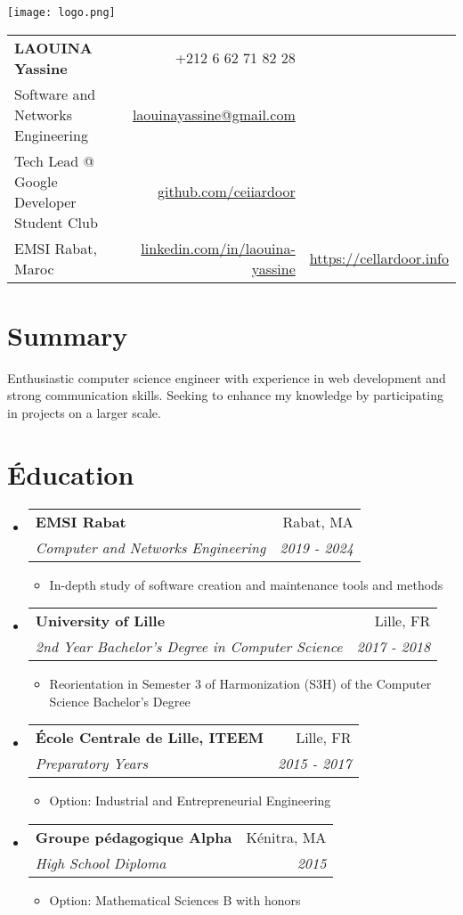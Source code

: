 \documentclass[a4paper,11pt]{article}
\makeatletter
\newcommand{\resitem}[1]{\item #1 \vspace{-1pt}}
\newcommand{\ressubheading}[4]{
\begin{tabular*}{6.5in}{l@{\cftdotfill{\cftsecdotsep}\extracolsep{\fill}}r}
		\textbf{#1} & #2 \\
		\textit{#3} & \textit{#4} \\
\end{tabular*}\vspace{-6pt}}
\newcommand{\name}{LAOUINA Yassine}
\newcommand{\course}{Software and Networks Engineering}
\newcommand{\phone}{62 71 82 28}
\newcommand{\emaila}{laouinayassine@gmail.com}
\newcommand{\github}{github.com/ceiiardoor}
\newcommand{\website}{https://cellardoor.info}
\newcommand{\linkedin}{linkedin.com/in/laouina-yassine}
\makeatother
\begin{document}
\selectfont

\parbox{2.35cm}{

\texttt{[image: logo.png]}

}
\parbox{\dimexpr\linewidth-2.8cm\relax}{
\begin{tabularx}{\linewidth}{L r}
  \textbf{\LARGE \name} & +212 6 \phone\\
  
  \course &  \href{mailto:\emaila}{\emaila}\\
   {Tech Lead @ Google Developer Student Club} &  \href{https://github.com/ceiiardoor}{\github} \\ 
  {EMSI Rabat, Maroc} & \href{https://www.linkedin.com/in/laouina-yassine/}{\linkedin} & \href{https://cellardoor.info/}{\website} 
\end{tabularx}
}
\vspace{-3mm}

\section{\textbf{Summary}}
Enthusiastic computer science engineer with experience in web development and strong communication skills. Seeking to enhance my knowledge by participating in projects on a larger scale.

\vspace{-3mm}
\section{\textbf{Éducation}}
\setlength{\tabcolsep}{5pt} 

\begin{itemize}
\item
	\ressubheading{EMSI Rabat}{Rabat, MA}{Computer and Networks Engineering}{2019 - 2024}
	\begin{itemize}
		\resitem{In-depth study of software creation and maintenance tools and methods}
	\end{itemize}

\item
	\ressubheading{University of Lille}{Lille, FR}{2nd Year Bachelor's Degree in Computer Science}{2017 - 2018}
	\begin{itemize}
		\resitem{Reorientation in Semester 3 of Harmonization (S3H) of the Computer Science Bachelor's Degree}
	\end{itemize}
	
\item
	\ressubheading{École Centrale de Lille, ITEEM}{Lille, FR}{Preparatory Years}{2015 - 2017}
	\begin{itemize}
		\resitem{Option: Industrial and Entrepreneurial Engineering}
	\end{itemize}
	
\item
	\ressubheading{Groupe pédagogique Alpha}{Kénitra, MA}{High School Diploma}{2015}
	\begin{itemize}
		\resitem{Option: Mathematical Sciences B with honors}
	\end{itemize}	
\end{itemize}
\vspace{-5mm}
\end{document}
